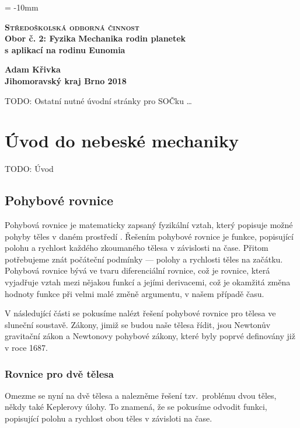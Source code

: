 \documentclass[A4paper, 12pt, oneside]{book}
\newcommand{\B}[1]{\textbf{#1}}
\renewcommand{\S}[1]{\textsc{#1}}
\begin{document}
\voffset = -10mm
\begin{center}
	{\LARGE \B{\S{Středoškolská odborná činnost}}} \\
	{\large \B{{Obor č. 2: Fyzika}}}
	\vfill
	{\Huge \B{Mechanika rodin planetek \\ s aplikací na rodinu Eunomia}}
\end{center}
	\vfill
{\large \bfseries Adam Křivka \\
	Jihomoravský kraj \hfill Brno 2018}

\newpage

TODO: Ostatní nutné úvodní stránky pro SOČku \ldots

\newpage
\tableofcontents
\newpage

\chapter{Úvod do nebeské mechaniky}
TODO: Úvod
\vspace{40mm}
\section{Pohybové rovnice}
Pohybová rovnice je matematicky zapsaný fyzikální vztah, který popisuje možné pohyby těles v daném prostředí \cite{wiki:eqm}. Řešením pohybové rovnice je funkce, popisující polohu a rychlost každého zkoumaného tělesa v závislosti na čase. Přitom potřebujeme znát počáteční podmínky --- polohy a rychlosti těles na začátku. Pohybová rovnice bývá ve tvaru diferenciální rovnice, což je rovnice, která vyjadřuje vztah mezi nějakou funkcí a jejími derivacemi, což je okamžitá změna hodnoty funkce při velmi malé změně argumentu, v našem případě času. 

V následující části se pokusíme nalézt řešení pohybové rovnice pro tělesa ve sluneční soustavě. Zákony, jimiž se budou naše tělesa řídit, jsou Newtonův gravitační zákon a Newtonovy pohybové zákony, které byly poprvé definovány již v roce 1687.
\subsection{Rovnice pro dvě tělesa} \label{sec:2body}
Omezme se nyní na dvě tělesa a nalezněme řešení tzv.\ problému dvou těles, někdy také Keplerovy úlohy. To znamená, že se pokusíme odvodit funkci, popisující polohu a rychlost obou těles v závisloti na čase. 
\end{document}
